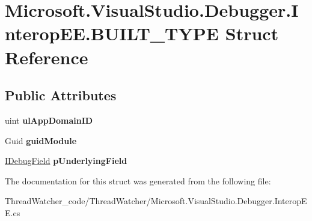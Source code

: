 \hypertarget{struct_microsoft_1_1_visual_studio_1_1_debugger_1_1_interop_e_e_1_1_b_u_i_l_t___t_y_p_e}{\section{Microsoft.\+Visual\+Studio.\+Debugger.\+Interop\+E\+E.\+B\+U\+I\+L\+T\+\_\+\+T\+Y\+P\+E Struct Reference}
\label{struct_microsoft_1_1_visual_studio_1_1_debugger_1_1_interop_e_e_1_1_b_u_i_l_t___t_y_p_e}
}
\subsection*{Public Attributes}
\begin{DoxyCompactItemize}
\item 
\hypertarget{struct_microsoft_1_1_visual_studio_1_1_debugger_1_1_interop_e_e_1_1_b_u_i_l_t___t_y_p_e_ae6d8b6a7f2260092aa6184755a6fb4da}{uint {\bfseries ul\+App\+Domain\+I\+D}}\label{struct_microsoft_1_1_visual_studio_1_1_debugger_1_1_interop_e_e_1_1_b_u_i_l_t___t_y_p_e_ae6d8b6a7f2260092aa6184755a6fb4da}

\item 
\hypertarget{struct_microsoft_1_1_visual_studio_1_1_debugger_1_1_interop_e_e_1_1_b_u_i_l_t___t_y_p_e_ad1c6a52036c4b536d9e66f7ead3870c8}{Guid {\bfseries guid\+Module}}\label{struct_microsoft_1_1_visual_studio_1_1_debugger_1_1_interop_e_e_1_1_b_u_i_l_t___t_y_p_e_ad1c6a52036c4b536d9e66f7ead3870c8}

\item 
\hypertarget{struct_microsoft_1_1_visual_studio_1_1_debugger_1_1_interop_e_e_1_1_b_u_i_l_t___t_y_p_e_af60daf77f66490a60233d497d8034b83}{\hyperlink{interface_microsoft_1_1_visual_studio_1_1_debugger_1_1_interop_e_e_1_1_i_debug_field}{I\+Debug\+Field} {\bfseries p\+Underlying\+Field}}\label{struct_microsoft_1_1_visual_studio_1_1_debugger_1_1_interop_e_e_1_1_b_u_i_l_t___t_y_p_e_af60daf77f66490a60233d497d8034b83}

\end{DoxyCompactItemize}


The documentation for this struct was generated from the following file\+:\begin{DoxyCompactItemize}
\item 
Thread\+Watcher\+\_\+code/\+Thread\+Watcher/Microsoft.\+Visual\+Studio.\+Debugger.\+Interop\+E\+E.\+cs\end{DoxyCompactItemize}
